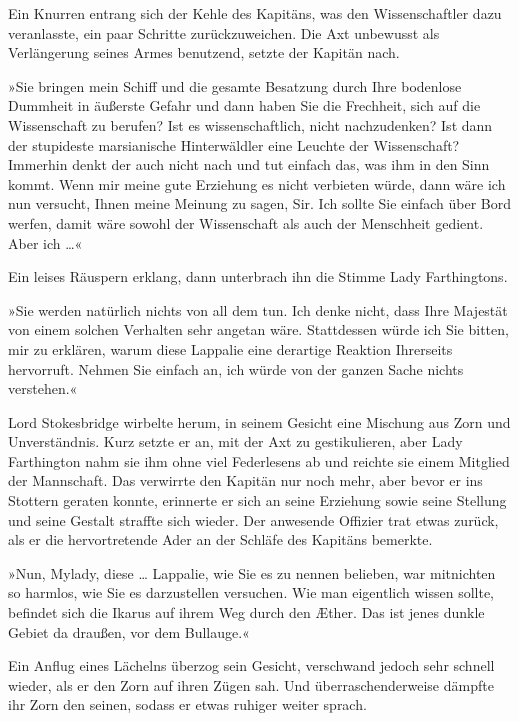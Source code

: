 Ein Knurren entrang sich der Kehle des Kapitäns, was den
Wissenschaftler dazu veranlasste, ein paar Schritte
zurückzuweichen. Die Axt unbewusst als Verlängerung seines Armes
benutzend, setzte der Kapitän nach.

»Sie bringen mein Schiff und die gesamte Besatzung durch Ihre
bodenlose Dummheit in äußerste Gefahr und dann haben Sie die
Frechheit, sich auf die Wissenschaft zu berufen? Ist es
wissenschaftlich, nicht nachzudenken? Ist dann der stupideste
marsianische Hinterwäldler eine Leuchte der Wissenschaft? Immerhin
denkt der auch nicht nach und tut einfach das, was ihm in den Sinn
kommt. Wenn mir meine gute Erziehung es nicht verbieten würde, dann
wäre ich nun versucht, Ihnen meine Meinung zu sagen, Sir. Ich
sollte Sie einfach über Bord werfen, damit wäre sowohl der
Wissenschaft als auch der Menschheit gedient. Aber ich \ldots{}«

Ein leises Räuspern erklang, dann unterbrach ihn die Stimme Lady
Farthingtons.

»Sie werden natürlich nichts von all dem tun. Ich denke nicht, dass
Ihre Majestät von einem solchen Verhalten sehr angetan wäre.
Stattdessen würde ich Sie bitten, mir zu erklären, warum diese
Lappalie eine derartige Reaktion Ihrerseits hervorruft. Nehmen Sie
einfach an, ich würde von der ganzen Sache nichts verstehen.«

Lord Stokesbridge wirbelte herum, in seinem Gesicht eine Mischung
aus Zorn und Unverständnis. Kurz setzte er an, mit der Axt zu
gestikulieren, aber Lady Farthington nahm sie ihm ohne viel
Federlesens ab und reichte sie einem Mitglied der Mannschaft. Das
verwirrte den Kapitän nur noch mehr, aber bevor er ins Stottern
geraten konnte, erinnerte er sich an seine Erziehung sowie seine
Stellung und seine Gestalt straffte sich wieder. Der anwesende
Offizier trat etwas zurück, als er die hervortretende Ader an der
Schläfe des Kapitäns bemerkte.

»Nun, Mylady, diese \ldots{} Lappalie, wie Sie es zu nennen belieben,
war mitnichten so harmlos, wie Sie es darzustellen versuchen. Wie
man eigentlich wissen sollte, befindet sich die Ikarus auf ihrem
Weg durch den Æther. Das ist jenes dunkle Gebiet da draußen, vor
dem Bullauge.«

Ein Anflug eines Lächelns überzog sein Gesicht, verschwand jedoch
sehr schnell wieder, als er den Zorn auf ihren Zügen sah. Und
überraschenderweise dämpfte ihr Zorn den seinen, sodass er etwas
ruhiger weiter sprach.


